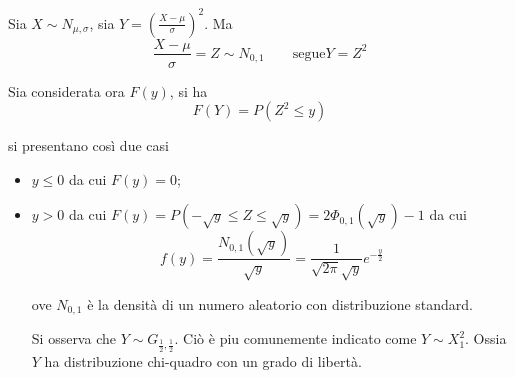 \documentclass{subfiles}
\begin{document}
Sia \(X \sim N_{\mu, \sigma}\), sia \(Y = (\tfrac{X - \mu}{\sigma})^{2}\).
Ma
\[
    \frac{X - \mu}{\sigma} = Z \sim N_{0, 1} \qquad \text{segue} Y = Z^{2}
\]

\noindent Sia considerata ora \(F(y)\), si ha
\[
    F(Y) = P(Z^{2} \le y)
\]

\noindent si presentano così due casi
\begin{itemize}
    \item \(y \le 0\) da cui \(F(y) = 0\);
    \item \(y > 0\) da cui \(F(y) = P(- \sqrt{y} \le Z \le \sqrt{y}) = 2 \Phi_{0, 1}(\sqrt{y}) - 1\)
          \noindent da cui
          \[
              f(y) = \frac{N_{0, 1}(\sqrt{y})}{\sqrt{y}} = \frac{1}{\sqrt{2\pi}\sqrt{y}} e^{- \tfrac{y}{2}}
          \]

          ove \(N_{0, 1}\) è la densità di un numero aleatorio con distribuzione standard.

          \noindent Si osserva che \(Y \sim G_{\tfrac{1}{2}, \tfrac{1}{2}}\). Ciò è piu comunemente indicato come \(Y \sim X^{2}_{1}\).
          Ossia \(Y\) ha distribuzione chi-quadro con un grado di libertà.
\end{itemize}
\end{document}
